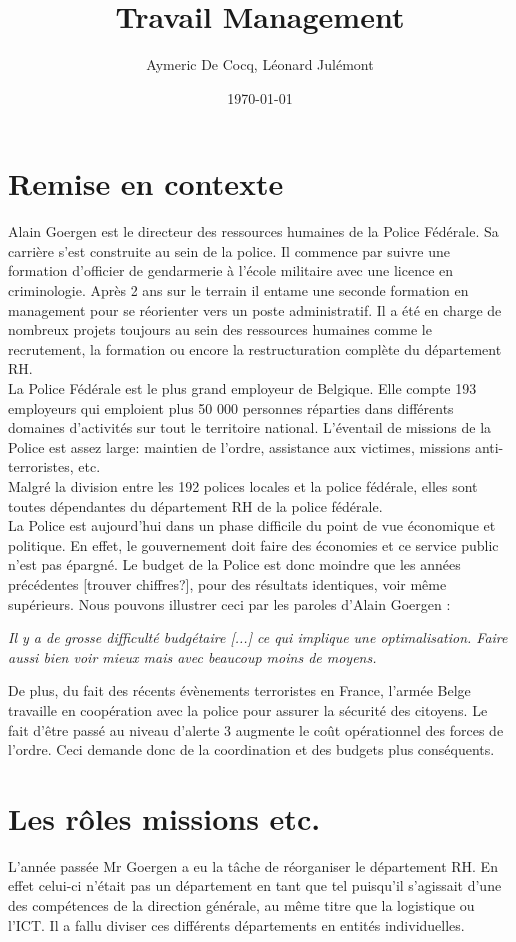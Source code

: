 \documentclass[12pt]{article}
\title{Travail Management}
\author{Aymeric De Cocq, Léonard Julémont}
\date{\today}
\begin{document}
\section{Remise en contexte}


Alain Goergen est le directeur des ressources humaines de la Police Fédérale. Sa carrière s'est construite au sein de la police. Il commence par suivre une formation d'officier de gendarmerie à l'école militaire avec une licence en criminologie. Après 2 ans sur le terrain il entame une seconde formation en management pour se réorienter vers un poste administratif. Il a été en charge de nombreux projets toujours au sein des ressources humaines comme le recrutement, la formation ou encore la restructuration complète du département RH.\\

La Police Fédérale est le plus grand employeur de Belgique. Elle compte 193 employeurs qui emploient plus 50 000 personnes réparties dans différents domaines d'activités sur tout le territoire national. L'éventail de missions de la Police est assez large: maintien de l'ordre, assistance aux victimes, missions anti-terroristes, etc.\\
Malgré la division entre les 192 polices locales et la police fédérale, elles sont toutes dépendantes du département RH de la police fédérale.\\
 
La Police est aujourd'hui dans un phase difficile du point de vue économique et politique. En effet, le gouvernement doit faire des économies et ce service public n'est pas épargné. Le budget de la Police est donc moindre que les années précédentes [trouver chiffres?], pour des résultats identiques, voir même supérieurs. Nous pouvons illustrer ceci par les paroles d'Alain Goergen : 

\begin{center}
	\textit{Il y a de grosse difficulté budgétaire [...] ce qui implique une optimalisation. Faire aussi bien voir mieux mais avec beaucoup moins de moyens.}
\end{center} 

De plus, du fait des récents évènements terroristes en France, l'armée Belge travaille en coopération avec la police pour assurer la sécurité des citoyens. Le fait d'être passé au niveau d'alerte 3 augmente le coût opérationnel des forces de l'ordre. Ceci demande donc de la coordination et des budgets plus conséquents.

\section{Les rôles missions etc.}
L'année passée Mr Goergen a eu la tâche de réorganiser le département RH. En effet celui-ci n'était pas un département en tant que tel puisqu'il s'agissait d'une des compétences de la direction générale, au même titre que la logistique ou l'ICT. Il a fallu diviser ces différents départements en entités individuelles.\\
\end{document}

